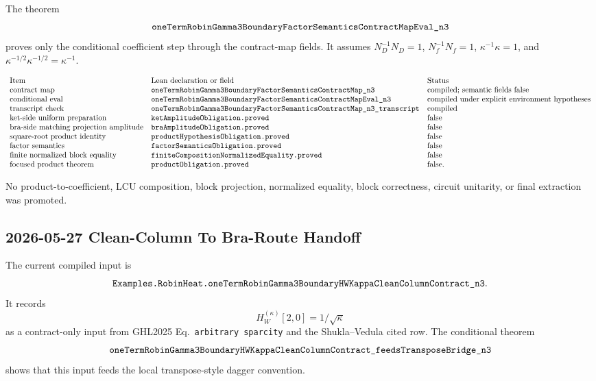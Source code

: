 The theorem
\[
  \texttt{oneTermRobinGamma3BoundaryFactorSemanticsContractMapEval\_n3}
\]
proves only the conditional coefficient step through the contract-map fields.
It assumes \(N_D^{-1}N_D=1\), \(N_f^{-1}N_f=1\),
\(\kappa^{-1}\kappa=1\), and
\(\kappa^{-1/2}\kappa^{-1/2}=\kappa^{-1}\).

\[
\begin{array}{lll}
\text{Item} & \text{Lean declaration or field} & \text{Status}\\
\text{contract map} &
\texttt{oneTermRobinGamma3BoundaryFactorSemanticsContractMap\_n3} &
\text{compiled; semantic fields false}\\
\text{conditional eval} &
\texttt{oneTermRobinGamma3BoundaryFactorSemanticsContractMapEval\_n3} &
\text{compiled under explicit environment hypotheses}\\
\text{transcript check} &
\texttt{oneTermRobinGamma3BoundaryFactorSemanticsContractMap\_n3\_transcript} &
\text{compiled}\\
\text{ket-side uniform preparation} &
\texttt{ketAmplitudeObligation.proved} & \text{false}\\
\text{bra-side matching projection amplitude} &
\texttt{braAmplitudeObligation.proved} & \text{false}\\
\text{square-root product identity} &
\texttt{productHypothesisObligation.proved} & \text{false}\\
\text{factor semantics} &
\texttt{factorSemanticsObligation.proved} & \text{false}\\
\text{finite normalized block equality} &
\texttt{finiteCompositionNormalizedEquality.proved} & \text{false}\\
\text{focused product theorem} &
\texttt{productObligation.proved} & \text{false}.
\end{array}
\]

No product-to-coefficient, LCU composition, block projection, normalized
equality, block correctness, circuit unitarity, or final extraction was
promoted.

\subsection{2026-05-27 Clean-Column To Bra-Route Handoff}

The current compiled input is
\[
  \texttt{Examples.RobinHeat.oneTermRobinGamma3BoundaryHWKappaCleanColumnContract\_n3}.
\]
It records
\[
  H_W^{(\kappa)}[2,0] = 1/\sqrt{\kappa}
\]
as a contract-only input from GHL2025 Eq.~\texttt{arbitrary sparcity} and the
Shukla--Vedula cited row.  The conditional theorem
\[
  \texttt{oneTermRobinGamma3BoundaryHWKappaCleanColumnContract\_feedsTransposeBridge\_n3}
\]
shows that this input feeds the local transpose-style dagger convention.

